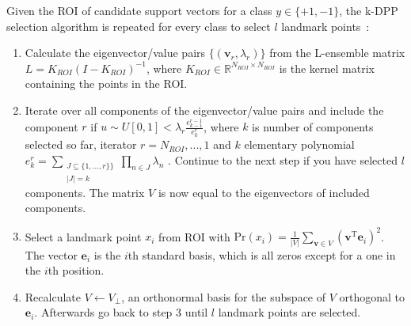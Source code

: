 \documentclass[preprint,12pt]{elsarticle}
\begin{document}
Given the ROI of candidate support vectors for a class $y \in \{+1,-1\}$, the k-DPP selection algorithm is repeated for every class to select $l$ landmark points~\cite{kulesza2011k}:
\begin{enumerate}
	\item Calculate the eigenvector/value pairs $\{(\mathbf{v}_r,\lambda_r)\}$ from the L-ensemble matrix $L = K_{ROI}(I - K_{ROI} )^{-1}$, where $K_{ROI} \in \mathbb{R}^{N_{ROI} \times N_{ROI}} $ is the kernel matrix containing the points in the ROI.
	\item Iterate over all components of the eigenvector/value pairs and include the component $r$ if $u \sim U[0, 1] < \lambda_r \frac{e_{k-1}^{r-1}}{e_k^r}$, where $k$ is number of components selected so far, iterator $r = N_{ROI},...,1$  and $k$ elementary polynomial $e_k^r = \sum_{\substack{J \subseteq \{1,...,r\}\} \\ |J| = k}}\prod_{n \in J} \lambda_n$ . Continue to the next step if you have selected $l$ components. The matrix $V$ is now equal to the eigenvectors of included components. 
	\item Select a landmark point $x_i$ from ROI with $\mathrm{Pr}(x_i) = \frac{1}{|V|} \sum_{\mathbf{v} \in V} (\mathbf{v}^\mathrm{T} \mathbf{e}_i)^2$. The vector $\mathbf{e}_i$ is the $i$th standard basis, which is all zeros except for a one
	in the $i$th position.
	\item Recalculate $V \leftarrow V_\perp$, an orthonormal basis for the subspace of $V$ orthogonal to $\mathbf{e}_i$. Afterwards go back to step 3 until $l$ landmark points are selected.
\end{enumerate}
	
\end{document}
